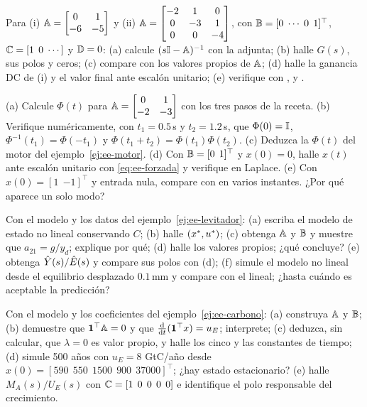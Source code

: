 \begin{problema}\label{prob:ee-resolvente}
Para (i) $\mathbb{A}=\begin{bmatrix}0&1\\-6&-5\end{bmatrix}$ y (ii) $\mathbb{A}=\begin{bmatrix}-2&1&0\\0&-3&1\\0&0&-4\end{bmatrix}$, con $\mathbb{B}=[0\;\cdots\;0\;\,1]^\top$, $\mathbb{C}=[1\;\,0\;\cdots]$ y $\mathbb{D}=0$: (a) calcule $(s\mathbb{I}-\mathbb{A})^{-1}$ con la adjunta; (b) halle $G(s)$, sus polos y ceros; (c) compare con los valores propios de $\mathbb{A}$; (d) halle la ganancia DC de (i) y el valor final ante escalón unitario; (e) \etiquetaM{} verifique con ,  y .
\end{problema}

\begin{problema}\label{prob:ee-transicion}
(a) Calcule $\Phi(t)$ para $\mathbb{A}=\begin{bmatrix}0&1\\-2&-3\end{bmatrix}$ con los tres pasos de la receta. (b) \etiquetaM{} Verifique numéricamente, con $t_1=0.5$\,s y $t_2=1.2$\,s, que $\Phi(0)=\mathbb{I}$, $\Phi^{-1}(t_1)=\Phi(-t_1)$ y $\Phi(t_1+t_2)=\Phi(t_1)\Phi(t_2)$. (c) Deduzca la $\Phi(t)$ del motor del ejemplo~\ref{ej:ee-motor}. (d) Con $\mathbb{B}=[0\;\,1]^\top$ y $x(0)=0$, halle $x(t)$ ante escalón unitario con \eqref{eq:ee-forzada} y verifique en Laplace. (e) \etiquetaM{} Con $x(0)=[1\;\,{-1}]^\top$ y entrada nula, compare con  en varios instantes. ¿Por qué aparece un solo modo?
\end{problema}

\begin{problema}[levitador]\label{prob:ee-levitador}
Con el modelo y los datos del ejemplo~\ref{ej:ee-levitador}: (a) escriba el modelo de estado no lineal conservando $C$; (b) halle $(x^{*},u^{*})$; (c) obtenga $\mathbb{A}$ y $\mathbb{B}$ y muestre que $a_{21}=g/y_d$; explique por qué; (d) halle los valores propios; ¿qué concluye? (e) obtenga $\hat{Y}(s)/\hat{E}(s)$ y compare sus polos con (d); (f) \etiquetaM{} simule el modelo no lineal desde el equilibrio desplazado $0.1$\,mm y compare con el lineal; ¿hasta cuándo es aceptable la predicción?
\end{problema}

\begin{problema}\label{prob:ee-carbono}
Con el modelo y los coeficientes del ejemplo~\ref{ej:ee-carbono}: (a) construya $\mathbb{A}$ y $\mathbb{B}$; (b) demuestre que $\mathbf 1^\top\mathbb{A}=0$ y que $\frac{\mathrm{d}}{\mathrm{d} t}(\mathbf 1^\top x)=u_E$; interprete; (c) deduzca, sin calcular, que $\lambda=0$ es valor propio, y \etiquetaM{} halle los cinco y las constantes de tiempo; (d) \etiquetaM{} simule 500 años con $u_E=8$ GtC/año desde $x(0)=[590\;\,550\;\,1500\;\,900\;\,37000]^\top$; ¿hay estado estacionario? (e) halle $M_A(s)/U_E(s)$ con $\mathbb{C}=[1\;\,0\;\,0\;\,0\;\,0]$ e identifique el polo responsable del crecimiento.
\end{problema}

